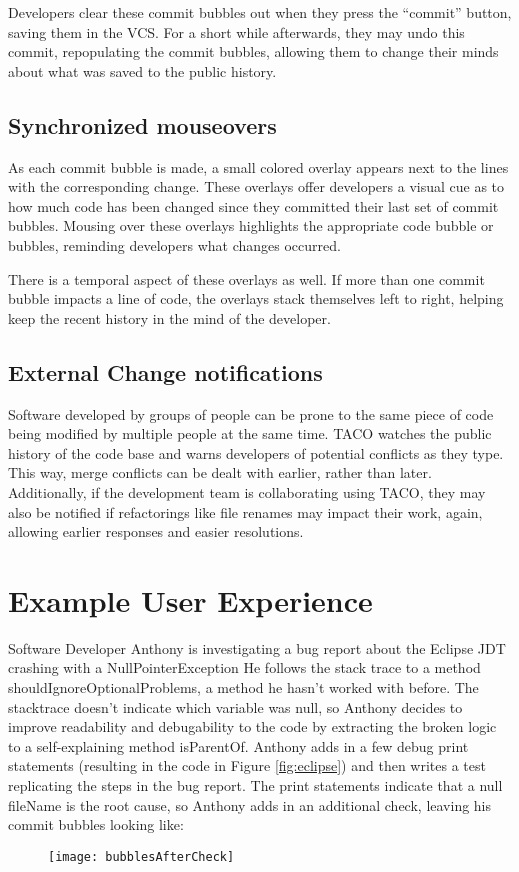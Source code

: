 \documentclass[conference]{IEEEtran}
\begin{document}
Developers clear these commit bubbles out when they press the ``commit'' button, saving them in the VCS.  
For a short while afterwards, they may undo this commit, repopulating the commit bubbles, allowing them to change their minds about what was saved to the public history.
\subsection{Synchronized mouseovers}
As each commit bubble is made, a small colored overlay appears next to the lines with the corresponding change.
These overlays offer developers a visual cue as to how much code has been changed since they 
committed their last set of commit bubbles.
Mousing over these overlays highlights the appropriate code bubble or bubbles,
reminding developers what changes occurred.

There is a temporal aspect of these overlays as well.
If more than one commit bubble impacts a line of code, the overlays stack
themselves left to right, helping keep the recent history in the mind of 
the developer.

\subsection{External Change notifications}
Software developed by groups of people can be prone to the same piece of code
being modified by multiple people at the same time.
TACO watches the public history of the code base and warns developers
of potential conflicts as they type.  
This way, merge conflicts can be dealt with earlier, rather than later.
Additionally, if the development team is collaborating using TACO, they
may also be notified if refactorings like file renames may impact their work, again, allowing earlier responses and easier resolutions.

\section{Example User Experience}
Software Developer Anthony is investigating a bug report about the Eclipse JDT crashing with a NullPointerException
He follows the stack trace to a method shouldIgnoreOptionalProblems, a method he hasn't worked with before.
The stacktrace doesn't indicate which variable was null, so Anthony decides to improve readability and debugability 
to the code by extracting the broken logic to a self-explaining method isParentOf.
Anthony adds in a few debug print statements (resulting in the code in Figure \ref{fig:eclipse}) and then writes a test replicating 
the steps in the bug report.
The print statements indicate that a null fileName is the root cause, so Anthony adds in an additional check,
leaving his commit bubbles looking like:
\begin{figure}[h]
\centering
\texttt{[image: bubblesAfterCheck]}
\end{figure}
\end{document}
